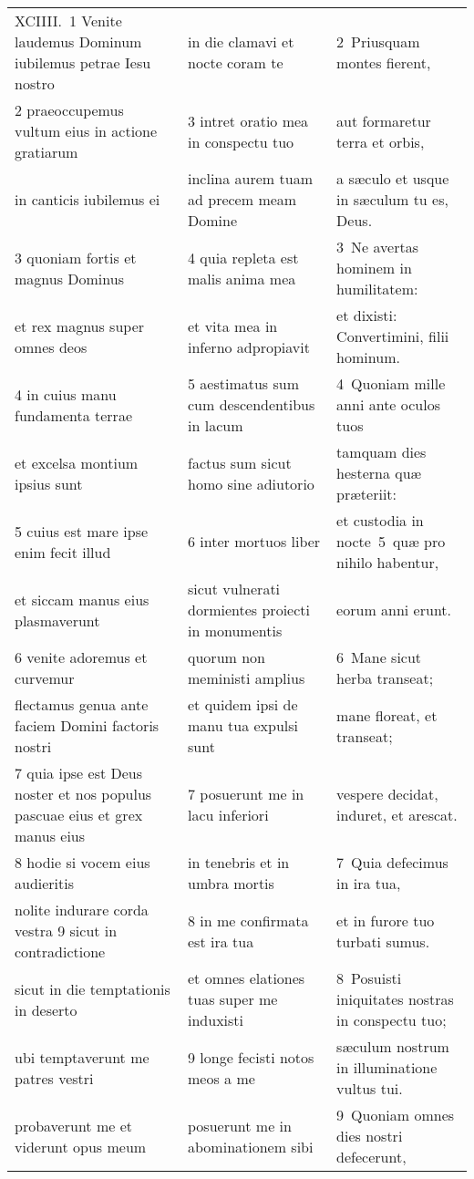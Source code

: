 \documentclass{article}
\begin{document}
\begin{longtable}{@{}p{}p{}p{}@{}}
XCIIII. 1 Venite laudemus Dominum iubilemus petrae Iesu nostro	&	in die clamavi et nocte coram te	&	2 Priusquam montes fierent,	\\
2 praeoccupemus vultum eius in actione gratiarum	&	3 intret oratio mea in conspectu tuo	&	aut formaretur terra et orbis,	\\
in canticis iubilemus ei	&	inclina aurem tuam ad precem meam Domine	&	a sæculo et usque in sæculum tu es, Deus.	\\
3 quoniam fortis et magnus Dominus	&	4 quia repleta est malis anima mea	&	3 Ne avertas hominem in humilitatem:	\\
et rex magnus super omnes deos	&	et vita mea in inferno adpropiavit	&	et dixisti: Convertimini, filii hominum.	\\
4 in cuius manu fundamenta terrae	&	5 aestimatus sum cum descendentibus in lacum	&	4 Quoniam mille anni ante oculos tuos	\\
et excelsa montium ipsius sunt	&	factus sum sicut homo sine adiutorio	&	tamquam dies hesterna quæ præteriit:	\\
5 cuius est mare ipse enim fecit illud	&	6 inter mortuos liber	&	et custodia in nocte 5 quæ pro nihilo habentur,	\\
et siccam manus eius plasmaverunt	&	sicut vulnerati dormientes proiecti in monumentis	&	eorum anni erunt.	\\
6 venite adoremus et curvemur	&	quorum non meministi amplius	&	6 Mane sicut herba transeat;	\\
flectamus genua ante faciem Domini factoris nostri	&	et quidem ipsi de manu tua expulsi sunt	&	mane floreat, et transeat;	\\
7 quia ipse est Deus noster et nos populus pascuae eius et grex manus eius	&	7 posuerunt me in lacu inferiori	&	vespere decidat, induret, et arescat.	\\
8 hodie si vocem eius audieritis	&	in tenebris et in umbra mortis	&	7 Quia defecimus in ira tua,	\\
nolite indurare corda vestra 9 sicut in contradictione	&	8 in me confirmata est ira tua	&	et in furore tuo turbati sumus.	\\
sicut in die temptationis in deserto	&	et omnes elationes tuas super me induxisti	&	8 Posuisti iniquitates nostras in conspectu tuo;	\\
ubi temptaverunt me patres vestri	&	9 longe fecisti notos meos a me	&	sæculum nostrum in illuminatione vultus tui.	\\
probaverunt me et viderunt opus meum	&	posuerunt me in abominationem sibi	&	9 Quoniam omnes dies nostri defecerunt,	\\

\end{longtable}
\end{document}
